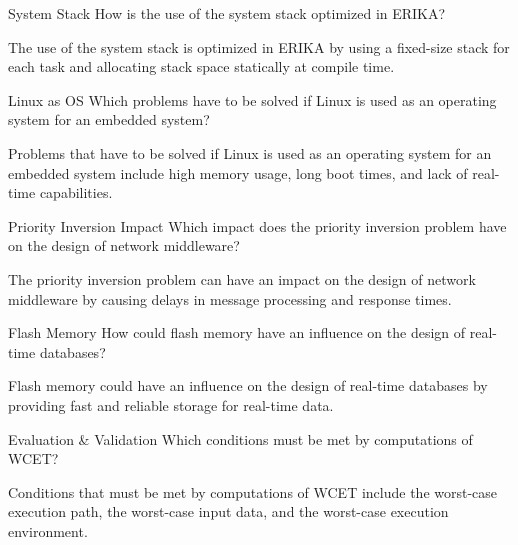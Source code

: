 \documentclass{article}
\begin{document}
\begin{exercise}{System Stack}
  How is the use of the system stack optimized in ERIKA?

  \begin{solution}
    The use of the system stack is optimized in ERIKA by using a fixed-size stack for each task and allocating stack space statically at compile time.
  \end{solution}
\end{exercise}

\begin{exercise}{Linux as OS}
  Which problems have to be solved if Linux is used as an operating system for an embedded system?

  \begin{solution}
    Problems that have to be solved if Linux is used as an operating system for an embedded system include high memory usage, long boot times, and lack of real-time capabilities.
  \end{solution}
\end{exercise}

\begin{exercise}{Priority Inversion Impact}
  Which impact does the priority inversion problem have on the design of network middleware?

  \begin{solution}
    The priority inversion problem can have an impact on the design of network middleware by causing delays in message processing and response times.
  \end{solution}
\end{exercise}

\begin{exercise}{Flash Memory}
  How could flash memory have an influence on the design of real-time databases?

  \begin{solution}
    Flash memory could have an influence on the design of real-time databases by providing fast and reliable storage for real-time data.
  \end{solution}
\end{exercise}


\begin{exercise}{Evaluation \& Validation}
  Which conditions must be met by computations of WCET?

  \begin{solution}
    Conditions that must be met by computations of WCET include the worst-case execution path, the worst-case input data, and the worst-case execution environment.
  \end{solution}
\end{exercise}
\end{document}
